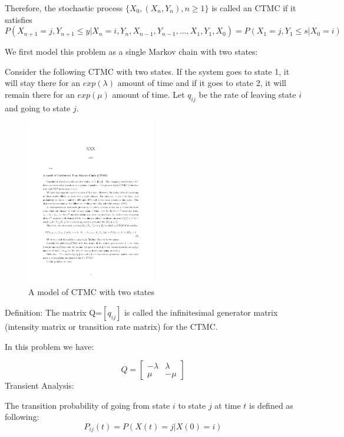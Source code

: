 \documentclass[12pt,letterpaper]{article}
\begin{document}
Therefore, the stochastic process $\{X_0, (X_n, Y_n), n\geq 1\}$ is called an CTMC if it satisfies 
\begin{equation}
P(X_{n+1}=j, Y_{n+1}\le y |X_n=i, Y_n, X_{n-1}, Y_{n-1},..., X_1, Y_1, X_0)
=P(X_1=j, Y_1\le s |X_0=i)
\end{equation}


We first model this problem as a single Markov chain with two states:

Consider the following CTMC with two states. If the system goes to state 1, it will stay there for an $exp(\lambda)$ amount of time and if it goes to state 2, it will remain there for an $exp(\mu)$ amount of time. Let $q_{ij}$ be the rate of leaving state $i$ and going to state $j$. 

\begin{figure}
  \centering
    
      \includegraphics[width=0.5\textwidth]{CTMC}
  \caption{A model of CTMC with two states}
\end{figure}


Definition: The matrix Q=$[q_{ij}]$ is called the infinitesimal generator matrix (intensity matrix or transition rate matrix) for the CTMC. 

In this problem we have:

\[
Q=
\begin{bmatrix} 
-\lambda & \lambda \\
\mu & -\mu 
\end{bmatrix}
\]
Transient Analysis:

The transition probability of going from state $i$ to state $j$ at time $t$ is defined as following:
\begin{equation}
P_{ij}(t)=P(X(t)=j|X(0)=i)
\end{equation}
\end{document}
